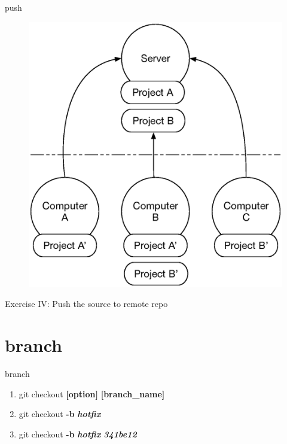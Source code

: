 \documentclass{beamer}
\begin{document}
\begin{frame}{push}
    \begin{figure}
        \center
        \includegraphics[width=.7\textwidth]{git-push}
        \label{fig:git-push}
    \end{figure}
\end{frame}

\begin{frame}{Exercise IV: Push the source to remote repo}
\end{frame}

\section{branch}
\begin{frame}{branch}
    \begin{enumerate}[\$]
        \item<1-> git checkout \textbf{[option]} \textbf{[branch\_name]}
        \item<2-> git checkout \textbf{-b} \textbf{\em{hotfix}}
        \item<3-> git checkout \textbf<4>{-b} \textbf<4>{\em{hotfix}} 
            \textbf<5>{\em{341be12}}
    \end{enumerate}
\end{frame}
\end{document}
